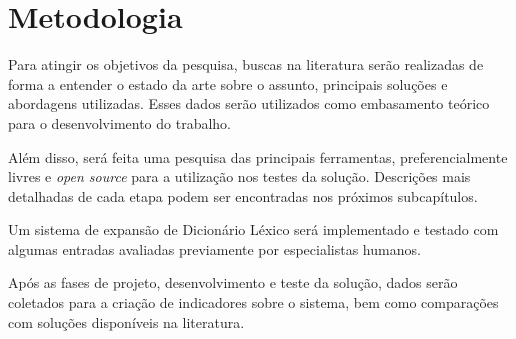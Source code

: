\documentclass[a4paper,11pt]{article}
\begin{document}
\section{Metodologia}
\label{sec:met}
Para atingir os objetivos da pesquisa, buscas na literatura serão realizadas de forma a entender o estado da arte sobre o assunto, principais soluções e abordagens utilizadas. Esses dados serão utilizados como embasamento teórico para o desenvolvimento do trabalho. 

Além disso, será feita uma pesquisa das principais ferramentas, preferencialmente livres e \emph{open source} para a utilização nos testes da solução. Descrições mais detalhadas de cada etapa podem ser encontradas nos próximos subcapítulos.

Um sistema de expansão de Dicionário Léxico será implementado e testado com algumas entradas avaliadas previamente por especialistas humanos.

Após as fases de projeto, desenvolvimento e teste da solução, dados serão coletados para a criação de indicadores sobre o sistema, bem como comparações com soluções disponíveis na literatura.
\end{document}
